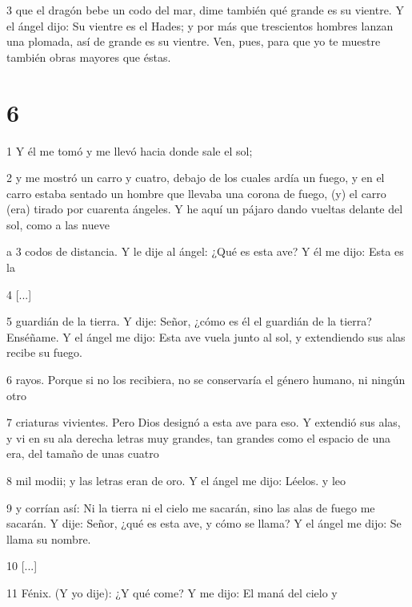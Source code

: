 \par 3 que el dragón bebe un codo del mar, dime también qué grande es su vientre. Y el ángel dijo: Su vientre es el Hades; y por más que trescientos hombres lanzan una plomada, así de grande es su vientre. Ven, pues, para que yo te muestre también obras mayores que éstas.

\chapter{6}

\par 1 Y él me tomó y me llevó hacia donde sale el sol;

\par 2 y me mostró un carro y cuatro, debajo de los cuales ardía un fuego, y en el carro estaba sentado un hombre que llevaba una corona de fuego, (y) el carro (era) tirado por cuarenta ángeles. Y he aquí un pájaro dando vueltas delante del sol, como a las nueve

\par a 3 codos de distancia. Y le dije al ángel: ¿Qué es esta ave? Y él me dijo: Esta es la

\par 4 [...]

\par 5 guardián de la tierra. Y dije: Señor, ¿cómo es él el guardián de la tierra? Enséñame. Y el ángel me dijo: Esta ave vuela junto al sol, y extendiendo sus alas recibe su fuego.

\par 6 rayos. Porque si no los recibiera, no se conservaría el género humano, ni ningún otro

\par 7 criaturas vivientes. Pero Dios designó a esta ave para eso. Y extendió sus alas, y vi en su ala derecha letras muy grandes, tan grandes como el espacio de una era, del tamaño de unas cuatro

\par 8 mil modii; y las letras eran de oro. Y el ángel me dijo: Léelos. y leo

\par 9 y corrían así: Ni la tierra ni el cielo me sacarán, sino las alas de fuego me sacarán. Y dije: Señor, ¿qué es esta ave, y cómo se llama? Y el ángel me dijo: Se llama su nombre.

\par 10 [...]

\par 11 Fénix. (Y yo dije): ¿Y qué come? Y me dijo: El maná del cielo y

